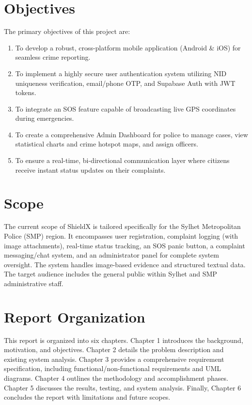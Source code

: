 \documentclass[11pt, a4paper]{report}
\begin{document}
\section{Objectives}
The primary objectives of this project are:
\begin{enumerate}
    \item To develop a robust, cross-platform mobile application (Android \& iOS) for seamless crime reporting.
    \item To implement a highly secure user authentication system utilizing NID uniqueness verification, email/phone OTP, and Supabase Auth with JWT tokens.
    \item To integrate an SOS feature capable of broadcasting live GPS coordinates during emergencies.
    \item To create a comprehensive Admin Dashboard for police to manage cases, view statistical charts and crime hotspot maps, and assign officers.
    \item To ensure a real-time, bi-directional communication layer where citizens receive instant status updates on their complaints.
\end{enumerate}

\section{Scope}
The current scope of ShieldX is tailored specifically for the Sylhet Metropolitan Police (SMP) region. It encompasses user registration, complaint logging (with image attachments), real-time status tracking, an SOS panic button, a complaint messaging/chat system, and an administrator panel for complete system oversight. The system handles image-based evidence and structured textual data. The target audience includes the general public within Sylhet and SMP administrative staff.

\section{Report Organization}
This report is organized into six chapters. Chapter 1 introduces the background, motivation, and objectives. Chapter 2 details the problem description and existing system analysis. Chapter 3 provides a comprehensive requirement specification, including functional/non-functional requirements and UML diagrams. Chapter 4 outlines the methodology and accomplishment phases. Chapter 5 discusses the results, testing, and system analysis. Finally, Chapter 6 concludes the report with limitations and future scopes.
\end{document}
